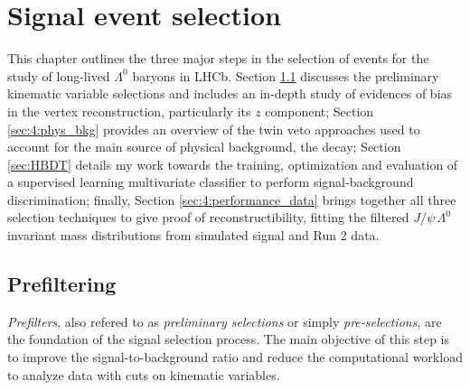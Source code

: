 \chapter{Signal event selection}
\label{cap:event_selection}
This chapter outlines the three major steps in the selection of \demonstratorshort events for the study of long-lived $\Lambda^0$ baryons in LHCb.
Section \ref{sec:prefilter} discusses the preliminary kinematic variable selections and includes an in-depth study of evidences of bias in the \lambdadecay vertex reconstruction, particularly its $z$ component;
Section \ref{sec:4:phys_bkg} provides an overview of the twin veto approaches used to account for the main source of physical background, the \physbkgshort decay;
Section \ref{sec:HBDT} details my work towards the training, optimization and evaluation of a supervised learning multivariate classifier to perform signal-background discrimination;
finally, Section \ref{sec:4:performance_data} brings together all three selection techniques to give proof of \demonstratorshort reconstructibility, fitting the filtered $J/\psi\,\Lambda^0$ invariant mass distributions from simulated signal and Run 2 data.

\section{Prefiltering}
\label{sec:prefilter}
\textit{Prefilters}, also refered to as \textit{preliminary selections} or simply \textit{pre-selections}, are the foundation of the signal selection process.
The main objective of this step is to improve the signal-to-background ratio and reduce the computational workload to analyze data with cuts on kinematic variables.

